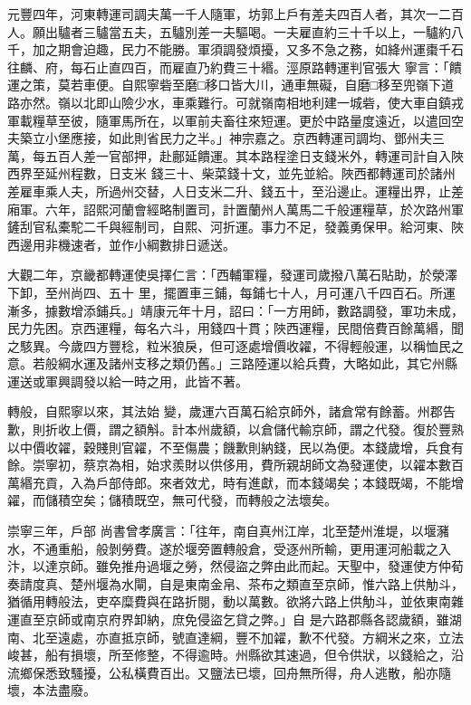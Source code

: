 \begin{pinyinscope}
 元豐四年，河東轉運司調夫萬一千人隨軍，坊郭上戶有差夫四百人者，其次一二百人。願出驢者三驢當五夫，五驢別差一夫驅喝。一夫雇直約三十千以上，一驢約八千，加之期會迫趣，民力不能勝。軍須調發煩擾，又多不急之務，如絳州運棗千石往麟、府，每石止直四百，而雇直乃約費三十緡。涇原路轉運判官張大
 寧言：「饋運之策，莫若車便。自熙寧砦至磨□移口皆大川，通車無礙，自磨□移至兜嶺下道路亦然。嶺以北即山險少水，車乘難行。可就嶺南相地利建一城砦，使大車自鎮戎軍載糧草至彼，隨軍馬所在，以軍前夫畜往來短運。更於中路量度遠近，以遣回空夫築立小堡應接，如此則省民力之半。」神宗嘉之。京西轉運司調均、鄧州夫三萬，每五百人差一官部押，赴鄜延饋運。其本路程塗日支錢米外，轉運司計自入陜西界至延州程數，日支米
 錢三十、柴菜錢十文，並先並給。陜西都轉運司於諸州差雇車乘人夫，所過州交替，人日支米二升、錢五十，至沿邊止。運糧出界，止差廂軍。六年，詔熙河蘭會經略制置司，計置蘭州人萬馬二千般運糧草，於次路州軍鏟刮官私橐駝二千與經制司，自熙、河折運。事力不足，發義勇保甲。給河東、陜西邊用非機速者，並作小綱數排日遞送。



 大觀二年，京畿都轉運使吳擇仁言：「西輔軍糧，發運司歲撥八萬石貼助，於滎澤下卸，至州尚四、五十
 里，擺置車三鋪，每鋪七十人，月可運八千四百石。所運漸多，據數增添鋪兵。」靖康元年十月，詔曰：「一方用師，數路調發，軍功未成，民力先困。京西運糧，每名六斗，用錢四十貫；陜西運糧，民間倍費百餘萬緡，聞之駭異。今歲四方豐稔，粒米狼戾，但可逐處增價收糴，不得輕般運，以稱恤民之意。若般綱水運及諸州支移之類仍舊。」三路陸運以給兵費，大略如此，其它州縣運送或軍興調發以給一時之用，此皆不著。



 轉般，自熙寧以來，其法始
 變，歲運六百萬石給京師外，諸倉常有餘蓄。州郡告歉，則折收上價，謂之額斛。計本州歲額，以倉儲代輸京師，謂之代發。復於豐熟以中價收糴，穀賤則官糴，不至傷農；饑歉則納錢，民以為便。本錢歲增，兵食有餘。崇寧初，蔡京為相，始求羨財以供侈用，費所親胡師文為發運使，以糴本數百萬緡充貢，入為戶部侍郎。來者效尤，時有進獻，而本錢竭矣；本錢既竭，不能增糴，而儲積空矣；儲積既空，無可代發，而轉般之法壞矣。



 崇寧三年，戶部
 尚書曾孝廣言：「往年，南自真州江岸，北至楚州淮堤，以堰瀦水，不通重船，般剝勞費。遂於堰旁置轉般倉，受逐州所輸，更用運河船載之入汴，以達京師。雖免推舟過堰之勞，然侵盜之弊由此而起。天聖中，發運使方仲荀奏請度真、楚州堰為水閘，自是東南金帛、茶布之類直至京師，惟六路上供觔斗，猶循用轉般法，吏卒糜費與在路折閱，動以萬數。欲將六路上供觔斗，並依東南雜運直至京師或南京府界卸納，庶免侵盜乞貸之弊。」自
 是六路郡縣各認歲額，雖湖南、北至遠處，亦直抵京師，號直達綱，豐不加糴，歉不代發。方綱米之來，立法峻甚，船有損壞，所至修整，不得逾時。州縣欲其速過，但令供狀，以錢給之，沿流鄉保悉致騷擾，公私橫費百出。又鹽法已壞，回舟無所得，舟人逃散，船亦隨壞，本法盡廢。




\end{pinyinscope}
